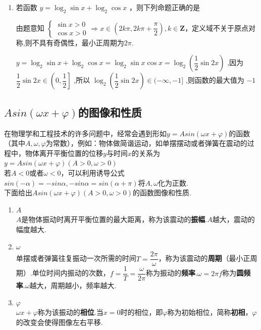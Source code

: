 \begin{enumerate}
    \item 若函数 $y = {\log }_{2}\sin x + {\log }_{2}\cos x$ ，则下列命题正确的是 
    \begin{jieda}
        由题意知 $\left\{  {\begin{array}{l} \sin x > 0 \\  \cos x > 0 \end{array} \Longrightarrow  x \in  \left( {{2k\pi },{2k\pi } + \dfrac{\pi }{2}}\right) ,k \in  \mathbf{Z}}\right.$，定义域不关于原点对称,则不具有奇偶性，最小正周期为$2\pi$.
        
        
        $y = {\log }_{2}\sin x +  {\log }_{2}\cos x = {\log }_{2}\sin x\cos x = {\log }_{2}\left( {\dfrac{1}{2}\sin {2x}}\right)$ ,因为 $\dfrac{1}{2}\sin {2x} \in  \left( {0,\dfrac{1}{2}}\right\rbrack$ ,所以 ${\log }_{2}\left( {\dfrac{1}{2}\sin {2x}}\right)  \in  ( - \infty , - 1\rbrack$ ,则函数的最大值为 $-1$
    \end{jieda}
\end{enumerate}


\subsection*{$Asin(\omega x+\varphi)$的图像和性质}
在物理学和工程技术的许多问题中，经常会遇到形如$y = Asin(\omega x + \varphi)$的函数（其中$A, \omega, \varphi$为常数），例如：物体做简谐运动，如单摆摆动或者弹簧在震动的过程中，物体离开平衡位置的位移$y$与时间$x$的关系为$y = Asin(\omega x + \varphi) (A > 0, \omega > 0)$ \\
若$A < 0$或者$\omega < 0$，可以利用诱导公式$sin(-\alpha) = -sin\alpha, -sin\alpha = sin(\alpha+\pi)$将$A, \omega$化为正数.\\
下面给出$Asin(\omega x + \varphi) (A > 0, \omega > 0)$的函数图像和性质.
\begin{enumerate}
    \item $A$ \\
    $A$是物体振动时离开平衡位置的最大距离，称为该震动的\textbf{振幅}.$A$越大，震动的幅度越大.
    \item $\omega$ \\
    单摆或者弹簧往复振动一次所需的时间$T = \dfrac{2\pi}{\omega}$，称为该震动的\textbf{周期}（最小正周期）.单位时间内振动的次数，$f = \dfrac{1}{T} = \dfrac{\omega}{2\pi}$称为振动的\textbf{频率}.$\omega = 2\pi f$称为\textbf{圆频率}.$\omega$越大，周期越小，频率越大.
    \item $\varphi$ \\
    $\omega x + \varphi$称为该振动的\textbf{相位}.当$x=0$时的相位，即$\varphi$称为初始相位，简称\textbf{初相}，$\varphi$的改变会使得图像左右平移.
\end{enumerate}

